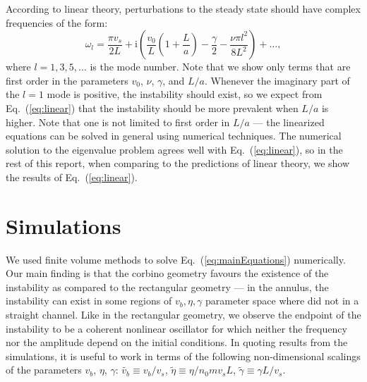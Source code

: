 \documentclass[12pt]{article}
\begin{document}
According to linear theory, perturbations to the steady state should have complex frequencies of the form:
\begin{equation}
\label{eq:linear}
    \omega_l = \frac{\pi v_s}{2L} + \mathrm{i}\left(\frac{v_0}{L}\left(1 + \frac{L}{a}\right)-\frac{\gamma}{2}-\frac{\nu\pi l^2}{8 L^2} \right) + \ldots,
\end{equation}
where $l = 1, 3, 5, \ldots$ is the mode number.  Note that we show only terms that are first order in the parameters $v_0$, $\nu$, $\gamma$, and $L / a$.  Whenever the imaginary part of the $l = 1$ mode is positive, the instability should exist, so we expect from Eq.~(\ref{eq:linear}) that the instability should be more prevalent when $L/a$ is higher.  Note that one is not limited to first order in $L/a$ --- the linearized equations can be solved in general using numerical techniques.  The numerical solution to the eigenvalue problem agrees well with Eq.~(\ref{eq:linear}), so in the rest of this report, when comparing to the predictions of linear theory, we show the results of Eq.~(\ref{eq:linear}).



\section{\label{sec:simulations}Simulations\protect}

We used finite volume methods to solve Eq.~(\ref{eq:mainEquations}) numerically. Our main finding is that the corbino geometry favours the existence of the instability as compared to the rectangular geometry --- in the annulus, the instability can exist in some regions of $v_b, \eta, \gamma$ parameter space where did not in a straight channel.  Like in the rectangular geometry, we observe the endpoint of the instability to be a coherent nonlinear oscillator for which neither the frequency nor the amplitude depend on the initial conditions.  In quoting results from the simulations, it is useful to work in terms of the following non-dimensional scalings of the parameters $v_b$, $\eta$, $\gamma$: $\tilde{v_b}\equiv v_b/v_s$, $\tilde{\eta} \equiv \eta/n_0 m v_s L$, $\tilde{\gamma} \equiv \gamma L / v_s$.
\end{document}
